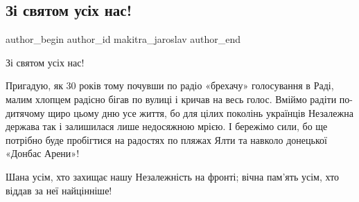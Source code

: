 
 
 
 
 
 
\subsection{Зі святом усіх нас!}
\label{sec:24_08_2021.fb.makitra_jaroslav.1.zi_svjatom_nezalezhnist}
 
\ifcmt
 author_begin
   author_id makitra_jaroslav
 author_end
\fi

Зі святом усіх нас! 

Пригадую, як 30 років тому почувши по радіо «брехачу» голосування в Раді, малим
хлопцем радісно бігав по вулиці і кричав на весь голос. Вміймо радіти
по-дитячому щиро цьому дню усе життя, бо для цілих поколінь українців Незалежна
держава так і залишилася лише недосяжною мрією. І бережімо сили, бо ще потрібно
буде пробігтися на радостях по пляжах Ялти та навколо донецької  «Донбас
Арени»! 

Шана усім, хто захищає нашу Незалежність на фронті; вічна пам’ять усім, хто
віддав за неї найцінніше!

